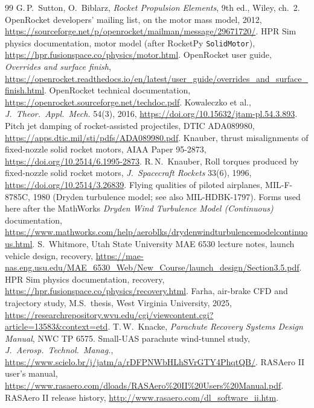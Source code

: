 \documentclass[10pt]{extarticle}
\numberwithin{equation}{subsection}
\begin{document}
\newpage
\begin{thebibliography}{99}
\small
{} G.\,P.\ Sutton, O.\ Biblarz, \emph{Rocket Propulsion Elements}, 9th ed., Wiley,
ch.\ 2.
 OpenRocket developers' mailing list, on the motor mass model, 2012,
\url{https://sourceforge.net/p/openrocket/mailman/message/29671720/}.
 HPR Sim physics documentation, motor model (after RocketPy \texttt{SolidMotor}),
\url{https://hpr.fusionspace.co/physics/motor.html}.
 OpenRocket user guide, \emph{Overrides and surface finish},
\url{https://openrocket.readthedocs.io/en/latest/user_guide/overrides_and_surface_finish.html}.
 OpenRocket technical documentation,
\url{https://openrocket.sourceforge.net/techdoc.pdf}.
 Kowaleczko et al., \emph{J.\ Theor.\ Appl.\ Mech.} 54(3), 2016,
\url{https://doi.org/10.15632/jtam-pl.54.3.893}.
 Pitch jet damping of rocket-assisted projectiles, DTIC ADA089980,
\url{https://apps.dtic.mil/sti/pdfs/ADA089980.pdf}.
 Knauber, thrust misalignments of fixed-nozzle solid rocket motors,
AIAA Paper 95-2873, \url{https://doi.org/10.2514/6.1995-2873}.
 R.\,N.\ Knauber, Roll torques produced by fixed-nozzle solid rocket motors,
\emph{J.\ Spacecraft Rockets} 33(6), 1996, \url{https://doi.org/10.2514/3.26839}.
 Flying qualities of piloted airplanes, MIL-F-8785C, 1980 (Dryden turbulence
model; see also MIL-HDBK-1797). Forms used here after the MathWorks \emph{Dryden Wind Turbulence
Model (Continuous)} documentation,
\url{https://www.mathworks.com/help/aeroblks/drydenwindturbulencemodelcontinuous.html}.
 S.\ Whitmore, Utah State University MAE 6530 lecture notes, launch vehicle
design, recovery,
\url{https://mae-nas.eng.usu.edu/MAE_6530_Web/New_Course/launch_design/Section3.5.pdf}.
 HPR Sim physics documentation, recovery,
\url{https://hpr.fusionspace.co/physics/recovery.html}.
 Farha, air-brake CFD and trajectory study, M.S.\ thesis, West Virginia
University, 2025,
\url{https://researchrepository.wvu.edu/cgi/viewcontent.cgi?article=13583&context=etd}.
T.\,W.\ Knacke, \emph{Parachute Recovery Systems Design Manual}, NWC TP 6575.
 Small-UAS parachute wind-tunnel study, \emph{J.\ Aerosp.\ Technol.\ Manag.},
\url{https://www.scielo.br/j/jatm/a/rDFPNWbHLhSVrGTY4PhqtQB/}.
 RASAero II user's manual, \url{https://www.rasaero.com/dloads/RASAero%20II%20Users%20Manual.pdf}.
 RASAero II release history, \url{http://www.rasaero.com/dl_software_ii.htm}.

\end{thebibliography}
\end{document}
